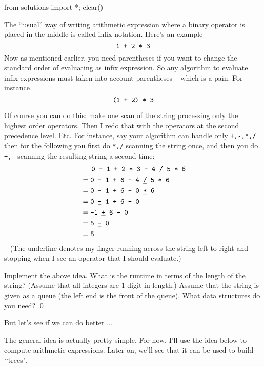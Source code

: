 \begin{python0}
from solutions import *; clear()
\end{python0}

The \lq\lq usual'' way of writing arithmetic expression
where a binary operator is placed in the middle is called
infix notation.
Here's an example
\[
\text{\texttt{1 + 2 * 3}}
\]
Now as mentioned earlier, you need parentheses
if you want to change the standard order of
evaluating as infix expression.
So any algorithm to evaluate infix expressions
must taken into account parentheses -- which is a pain.
For instance
\[
\text{\texttt{(1 + 2) * 3}}
\]

Of course you can do this:
make one scan of the string processing only
the highest order operators.
Then I redo that with the operators at the second
precedence level.
Etc.
For instance, say your algorithm can handle only \texttt{+,-,*,/}
then for the following you first do \texttt{*,/}
scanning the string once, and then you do
\texttt{+,-} scanning the resulting string a second time:
\texttt{
\begin{align*}
&  \hspace{0.521cm} \texttt{0 - 1 + 2 \underline{*} 3 - 4 / 5 * 6} \\
&= \texttt{0 - 1 + 6 - 4 \underline{/} 5 * 6} \\
&= \texttt{0 - 1 + 6 - 0 \underline{*} 6} \\
&= \texttt{0 \underline{-} 1 + 6 - 0} \\
&= \texttt{-1 \underline{+} 6 - 0} \\
&= \texttt{5 \underline{-} 0} \\
&= \texttt{5} 
\end{align*}
}
(The underline denotes my finger running across the string
left-to-right and stopping when I see an operator that I should
evaluate.)



\begin{ex}
Implement the above idea.
What is the runtime in terms of the length of the string?
(Assume that all integers are 1-digit in length.)
Assume that the string is given as a queue (the left end is the front
of the queue).
What data structures do you need?
\qed
\end{ex}

But let's see if we can do better ...

The general idea is actually pretty simple.
For now, I'll use the idea below to compute arithmetic expressions.
Later on, we'll see that it can be used to build \lq\lq trees".

